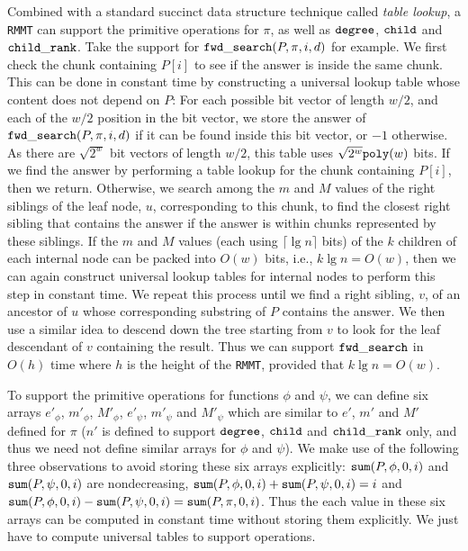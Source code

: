 
Combined with a standard succinct data structure technique called {\em table lookup}, a {\tt RMMT} can support the primitive operations for $\pi$, as well as $\mathtt{degree}$, $\mathtt{child}$ and $\mathtt{child\_rank}$. 
Take the support for $\mathtt{fwd\_search}(P,\pi,i,d)$ for example. 
We first check the chunk containing $P[i]$ to see if the answer is inside the same chunk. 
This can be done in constant time by constructing a universal lookup table whose content does not depend on $P$: For each possible bit vector of length $w/2$, and each of the $w/2$ position in the bit vector, we store the answer of $\mathtt{fwd\_search}(P,\pi,i,d)$ if it can be found inside this bit vector, or $-1$ otherwise. As there are $\sqrt{2^w}$ bit vectors of length $w/2$, this table uses $\sqrt{2^w}\mathtt{poly}(w)$ bits. 
If we find the  answer by performing a table lookup for the chunk containing $P[i]$, then we return. 
Otherwise, we search among the $m$ and $M$ values of the right siblings of the leaf node, $u$, corresponding to this chunk, to find the closest right sibling that contains the answer if the answer is within chunks represented by these siblings. 
If the $m$ and $M$ values (each using $\lceil\lg n\rceil$ bits) of the $k$ children of each internal node can be packed into $O(w)$ bits, i.e., $k \lg n = O(w)$, then we can again construct universal lookup tables for internal nodes to perform this step in constant time. 
We repeat this process until we find a right sibling, $v$, of an ancestor of $u$ whose corresponding substring of $P$ contains the answer. 
We then use a similar idea to descend down the tree starting from $v$ to look for the leaf descendant of $v$ containing the result. 
Thus we can support $\mathtt{fwd\_search}$ in $O(h)$ time where $h$ is the height of the {\tt RMMT}, provided that $k \lg n = O(w)$. 

To support the primitive operations for functions $\phi$ and $\psi$, we can define six arrays $e'_{\phi}$, $m'_{\phi}$, $M'_{\phi}$, $e'_{\psi}$, $m'_{\psi}$ and $M'_{\psi}$ which are similar to $e'$, $m'$ and $M'$ defined for $\pi$ ($n'$ is defined to support $\mathtt{degree}$, $\mathtt{child}$ and $\mathtt{child\_rank}$ only, and thus we need not define similar arrays for $\phi$ and $\psi$). 
We make use of the following three observations to avoid storing these six arrays explicitly: $\mathtt{sum}(P, \phi, 0, i)$ and $\mathtt{sum}(P, \psi, 0, i)$ are nondecreasing, $\mathtt{sum}(P, \phi, 0, i) + \mathtt{sum}(P, \psi, 0, i) = i$ and $\mathtt{sum}(P, \phi, 0, i) - \mathtt{sum}(P, \psi, 0, i) = \mathtt{sum}(P, \pi, 0, i)$. 
Thus the each value in these six arrays can be computed in constant time without storing them explicitly. 
We just have to compute universal tables to support operations. 

